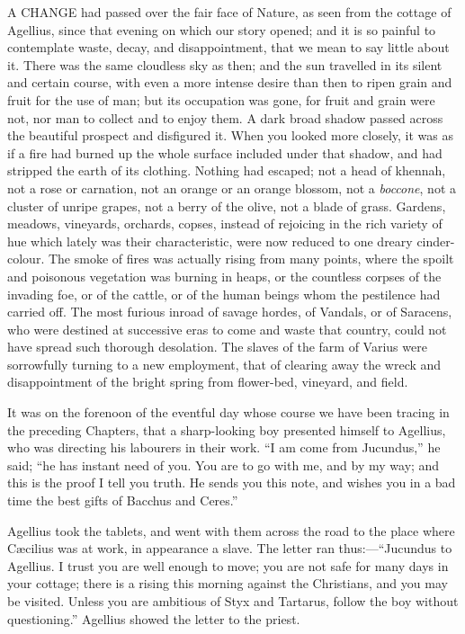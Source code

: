 A CHANGE had passed over the fair face of Nature, as seen
from the cottage of Agellius, since that evening on which our story
opened; and it is so painful to contemplate waste, decay, and
disappointment, that we mean to say little about it. There was the
same cloudless sky as then; and the sun travelled in its silent and
certain course, with even a more intense desire than then to ripen
grain and fruit for the use of man; but its occupation was gone, for
fruit and grain were not, nor man to collect and to enjoy them. A dark
broad shadow passed across the beautiful prospect and disfigured it.
When you looked more closely, it was as if a fire had burned up the
whole surface included under that shadow, and had stripped the earth
of its clothing. Nothing had escaped; not a head of khennah, not a
rose or carnation, not an orange or an orange blossom, not a \emph{boccone},
not a cluster of unripe grapes, not a berry of the olive, not a blade
of grass. Gardens, meadows, vineyards, orchards, copses, instead of
rejoicing in the rich variety of hue which lately was their
characteristic, were now reduced to one dreary cinder-colour.
The smoke of fires was actually rising from many points, where the
spoilt and poisonous vegetation was burning in heaps, or the countless
corpses of the invading foe, or of the cattle, or of the human beings
whom the pestilence had carried off. The most furious inroad of savage
hordes, of Vandals, or of Saracens, who were destined at successive
eras to come and waste that country, could not have spread such
thorough desolation. The slaves of the farm of Varius were sorrowfully
turning to a new employment, that of clearing away the wreck and
disappointment of the bright spring from flower-bed, vineyard, and
field.

It was on the forenoon of the eventful day whose course we have
been tracing in the preceding Chapters, that a sharp-looking boy
presented himself to Agellius, who was directing his labourers in
their work. ``I am come from Jucundus,'' he said; ``he has
instant need of you. You are to go with me, and by my way; and this is
the proof I tell you truth. He sends you this note, and wishes you in
a bad time the best gifts of Bacchus and Ceres.''

Agellius took the tablets, and went with them across the road to
the place where Cæcilius was at work, in appearance a slave. The
letter ran thus:—``Jucundus to Agellius. I trust you are well
enough to move; you are not safe for many days in your cottage; there
is a rising this morning against the Christians, and you may be
visited. Unless you are ambitious of Styx and Tartarus, follow the boy
without questioning.'' Agellius showed the letter to the
priest.

